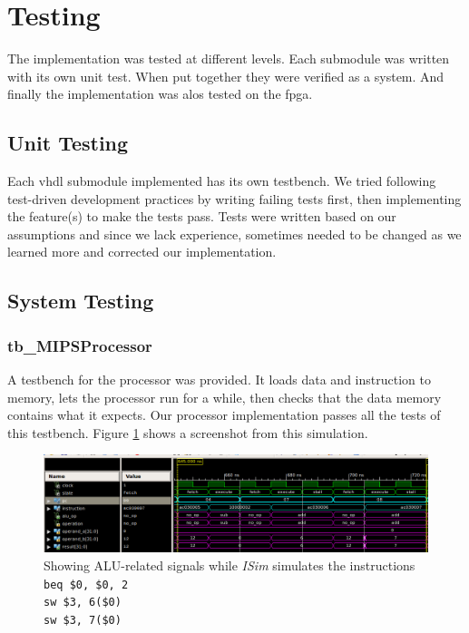 \section{Testing}
The implementation was tested at different levels.
Each submodule was written with its own unit test.
When put together they were verified as a system.
And finally the implementation was alos tested on the \gls{fpga}.

\subsection{Unit Testing}
Each \gls{vhdl} submodule implemented has its own testbench.
We tried following test-driven development practices by writing failing tests first, then implementing the feature(s) to make the tests pass.
Tests were written based on our assumptions and since we lack experience,
sometimes needed to be changed as we learned more and corrected our implementation.

\subsection{System Testing}
\subsubsection{tb\_MIPSProcessor}
A testbench for the processor was provided.
It loads data and instruction to memory,
lets the processor run for a while,
then checks that the data memory contains what it expects.
Our processor implementation passes all the tests of this testbench.
Figure \ref{fig:isim} shows a screenshot from this simulation.

\begin{figure}[p]
    \centering
    \includegraphics[width=\textwidth]{img/isim}
    \caption{Showing ALU-related signals while \textit{ISim} simulates the instructions\\
        \texttt{beq \$0, \$0, 2}\\
        \texttt{sw \$3, 6(\$0)}\\
        \texttt{sw \$3, 7(\$0)}
    }
    \label{fig:isim}
\end{figure}

